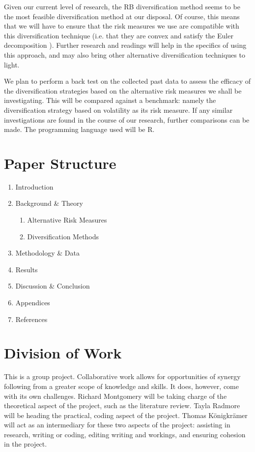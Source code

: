 \documentclass[12pt,a4paper]{article}
\newcommand{\be}{\begin{enumerate}}
\newcommand{\ee}{\end{enumerate}}
\begin{document}
Given our current level of research, the RB diversification method seems to be the most feasible diversification method at our disposal. Of course, this means that we will have to ensure that the risk measures we use are compatible with this diversification technique (i.e. that they are convex and satisfy the Euler decomposition \citep{bruder2012managing}). Further research and readings will help in the specifics of using this approach, and may also bring other alternative diversification techniques to light.

We plan to perform a back test on the collected past data to assess the efficacy of the diversification strategies based on the alternative risk measures we shall be investigating. This will be compared against a benchmark: namely the diversification strategy based on volatility as its risk measure. If any similar investigations are found in the course of our research, further comparisons can be made.  The programming language used will be R.

\section{Paper Structure}
\label{sec:struc}

\be
\item Introduction
\item Background \& Theory
	\be
	\item Alternative Risk Measures
	\item Diversification Methods
	\ee
\item Methodology \& Data
\item Results
\item Discussion \& Conclusion
\item Appendices %
\item References
\ee
 
\section{Division of Work}
\label{sec:dow} 

This is a group project. Collaborative work allows for opportunities of synergy following from a greater scope of knowledge and skills. It does, however, come with its own challenges. Richard Montgomery will be taking charge of the theoretical aspect of the project, such as the literature review. Tayla Radmore will be heading the practical, coding aspect of the project. Thomas K{\"o}nigkr{\"a}mer will act as an intermediary for these two aspects of the project: assisting in research, writing or coding, editing writing and workings, and ensuring cohesion in the project.
\end{document}
